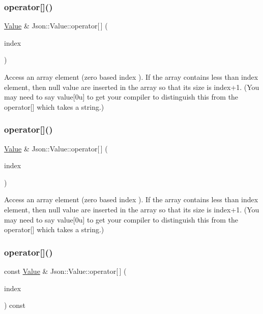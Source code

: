 \subsubsection{\texorpdfstring{operator[]()}{operator[]()}\hspace{0.1cm}{\footnotesize\ttfamily [1/9]}}
{\footnotesize\ttfamily \hyperlink{class_json_1_1_value}{Value} \& Json\+::\+Value\+::operator\mbox{[}$\,$\mbox{]} (\begin{DoxyParamCaption}\item[{Array\+Index}]{index }\end{DoxyParamCaption})}

Access an array element (zero based index ). If the array contains less than index element, then null value are inserted in the array so that its size is index+1. (You may need to say \textquotesingle{}value\mbox{[}0u\mbox{]}\textquotesingle{} to get your compiler to distinguish this from the operator\mbox{[}\mbox{]} which takes a string.) \mbox{\label{class_json_1_1_value_ac9182982c361e0ab621134d406e5f250}} 
\subsubsection{\texorpdfstring{operator[]()}{operator[]()}\hspace{0.1cm}{\footnotesize\ttfamily [2/9]}}
{\footnotesize\ttfamily \hyperlink{class_json_1_1_value}{Value} \& Json\+::\+Value\+::operator\mbox{[}$\,$\mbox{]} (\begin{DoxyParamCaption}\item[{int}]{index }\end{DoxyParamCaption})}

Access an array element (zero based index ). If the array contains less than index element, then null value are inserted in the array so that its size is index+1. (You may need to say \textquotesingle{}value\mbox{[}0u\mbox{]}\textquotesingle{} to get your compiler to distinguish this from the operator\mbox{[}\mbox{]} which takes a string.) \mbox{\label{class_json_1_1_value_a46607236038b29695ed80c15895271e4}} 
\subsubsection{\texorpdfstring{operator[]()}{operator[]()}\hspace{0.1cm}{\footnotesize\ttfamily [3/9]}}
{\footnotesize\ttfamily const \hyperlink{class_json_1_1_value}{Value} \& Json\+::\+Value\+::operator\mbox{[}$\,$\mbox{]} (\begin{DoxyParamCaption}\item[{Array\+Index}]{index }\end{DoxyParamCaption}) const}

